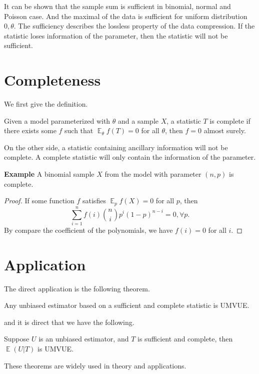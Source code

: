 \documentclass[12pt]{article}
\newcommand{\1}{\mathbbm{1}}
\newenvironment{theorem}[2][Theorem]{\begin{trivlist}
\item[\hskip \labelsep {\bfseries #1}\hskip \labelsep {\bfseries #2.}]}{\end{trivlist}}
\newcommand{\E}{\operatorname{\mathbb{E}}}
\newenvironment{definition}[1][Definition]{\begin{trivlist}
\item[\hskip \labelsep {\bfseries #1}]}{\end{trivlist}}
\begin{document}
It can be shown that the sample sum is sufficient in binomial, normal and Poisson case. And the maximal of the data is sufficient for uniform distribution ${0,\theta}$. The sufficiency describes the lossless property of the data compression. If the statistic loses information of the parameter, then the statistic will not be sufficient.

\section{Completeness}

We first give the definition.

\begin{definition}
 Given a model parameterized with $\theta$ and a sample $X$, a statistic $T$ is complete if there exists some $f$ such that $\E_\theta f(T) = 0$ for all $\theta$, then $f = 0$ almost surely.
\end{definition}

On the other side, a statistic containing ancillary information will not be complete. A complete statistic will only contain the information of the parameter. 

\textbf{Example} A binomial sample $X$ from the model with parameter $(n,p)$ is complete.
\begin{proof}
If some function $f$ satisfies $\E_p f(X) = 0$ for all $p$, then
$$
\sum_{i=1}^n f(i) {n\choose i}  p^i (1-p)^{n-i}  = 0 , \forall p.
$$
By compare the coefficient of the polynomials, we have $f(i) = 0$ for all $i$. 
\end{proof}

\section{Application}

The direct application is the following theorem.

\begin{theorem}{(Lehmann-Scheffe)}
Any unbiased estimator based on a sufficient and complete statistic is UMVUE.
\end{theorem}
and it is direct that we have the following.
\begin{theorem}{(Rao-Blackwell)}
Suppose $U$ is an unbiased estimator, and $T$ is sufficient and complete, then $\E (U |T)$ is UMVUE.
\end{theorem}

These theorems are widely used in theory and applications. 
\end{document}
